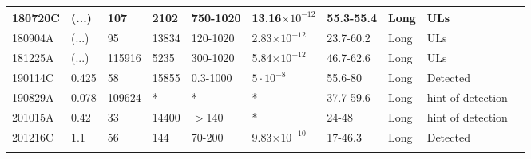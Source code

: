 \begin{longtable}{llllllllll}
                \midrule
180720C & (...)  & 107 & 2102 &  750-1020 & 13.16$\times10^{-12}$  & 55.3-55.4 & Long & ULs & \cite{2025AeA...700A..96A}  \\
                \midrule
180904A & (...)  & 95 & 13834 & 120-1020 &  2.83$\times10^{-12}$  & 23.7-60.2 & Long & ULs & \cite{2025AeA...700A..96A}  \\
                \midrule
181225A & (...)  & 115916 & 5235 & 300-1020  & 5.84$\times10^{-12}$ & 46.7-62.6 & Long & ULs & \cite{2025AeA...700A..96A}  \\
                \midrule
190114C & 0.425 & 58 & 15855 & 0.3-1000 & $5\cdot10^{-8}$ & 55.6-80 & Long & Detected & \cite{2019Natur.575..455M} \\
               \midrule
190829A & 0.078 & 109624 & *& * &*  & 37.7-59.6 & Long & hint of detection & \cite{YusukeSuda2026,2025AeA...700A..96A}  \\
                \midrule
201015A & 0.42 &  33 & 14400 & $>$140  & * & 24-48  &  Long & hint of detection &  \cite{2022icrc.confE.797S,YusukeSuda2026}  \\
                \midrule
201216C & 1.1 & 56 & 144 & 70-200 & 9.83$\times10^{-10}$ & 17-46.3 & Long & Detected & \cite{2024MNRAS.527.5856A}\\
			\bottomrule
	\noindent{      }
\end{longtable}
